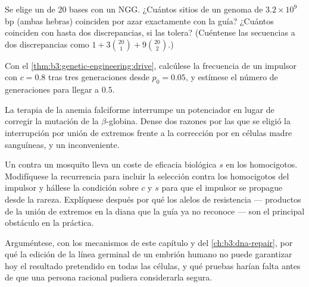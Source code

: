 \begin{exercise}[$\star\star$]\label{exo:b3:genetic-engineering:8}
Se elige un  de 20 bases con un  NGG. ¿Cuántos sitios de un
genoma de $3.2\times 10^{9}$ bp (ambas hebras) coinciden por azar
exactamente con la guía? ¿Cuántos coinciden con hasta dos discrepancias,
si  las tolera? (Cuéntense las secuencias a dos discrepancias como
$1 + 3\binom{20}{1} +
9\binom{20}{2}$.)
\end{exercise}

\begin{exercise}[$\star\star$]\label{exo:b3:genetic-engineering:9}
Con el \cref{thm:b3:genetic-engineering:drive}, calcúlese la frecuencia
de un impulsor con $c = 0.8$ tras tres generaciones desde $p_{0} = 0.05$,
y estímese el número de generaciones para llegar a $0.5$.
\end{exercise}

\begin{exercise}[$\star\star\star$]\label{exo:b3:genetic-engineering:10}
La terapia de la anemia falciforme interrumpe un potenciador en lugar de
corregir la mutación de la $\beta$-globina. Dense dos razones por las que
se eligió la interrupción por unión de extremos frente a la corrección
por  en células madre sanguíneas, y un
inconveniente.
\end{exercise}

\begin{exercise}[$\star\star\star$]\label{exo:b3:genetic-engineering:11}
Un  contra un mosquito lleva un coste de eficacia
biológica $s$ en los homocigotos. Modifíquese la recurrencia para
incluir la selección contra los homocigotos del impulsor y hállese la
condición sobre $c$ y $s$ para que el impulsor se propague desde la
rareza. Explíquese después por qué los alelos de resistencia ---
productos de la unión de extremos en la diana que la guía ya no reconoce
--- son el principal obstáculo en la práctica.
\end{exercise}

\begin{exercise}[$\star\star\star$]\label{exo:b3:genetic-engineering:12}
Arguméntese, con los mecanismos de este capítulo y del
\cref{ch:b3:dna-repair}, por qué la edición de la línea germinal de un
embrión humano no puede garantizar hoy el resultado pretendido en todas
las células, y qué pruebas harían falta antes de que una persona racional
pudiera considerarla segura.
\end{exercise}

